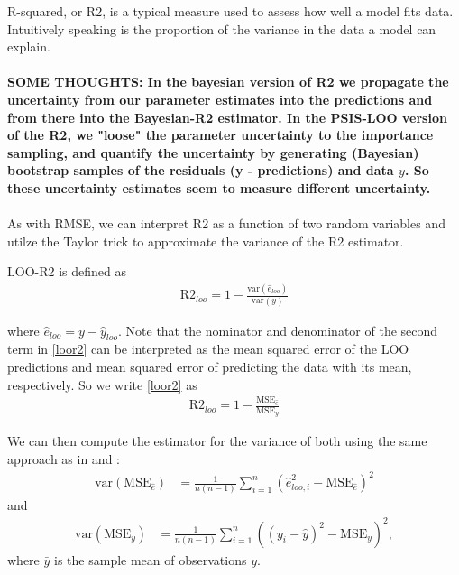 \documentclass{article}
\begin{document}

R-squared, or R2, is a typical measure used to assess how well a model fits data. Intuitively speaking is the proportion of the variance in the data a model can explain. 
\\ \\
\textbf{SOME THOUGHTS: In the bayesian version of R2 we propagate the uncertainty from our parameter estimates into the predictions and from there into the Bayesian-R2 estimator. In the PSIS-LOO version of the R2, we "loose" the parameter uncertainty to the importance sampling, and quantify the uncertainty by generating (Bayesian) bootstrap samples of the residuals (y - predictions) and data $y$. So these uncertainty estimates seem to measure different uncertainty.
}\\ \\

As with RMSE, we can interpret R2 as a function of two random variables and utilze the Taylor trick to approximate the variance of the R2 estimator.

LOO-R2 is defined as
\begin{align}
\text{R2}_{loo} = 1 - \frac{\text{var}(\hat{e}_{loo}) }{ \text{var}(y)} \label{loor2}
\end{align}

where $\hat{e}_{loo} = y - \hat{y}_{loo}$. Note that the nominator and denominator of the second term in \eqref{loor2} can be interpreted as the mean squared error of the LOO predictions and mean squared error of predicting the data with its mean, respectively. So we write \eqref{loor2} as 
\begin{align}
    \text{R2}_{loo} = 1 - \frac{\text{MSE}_{\hat{e}} }{ \text{MSE}_y} \label{mser2}
\end{align}

We can then compute the estimator for the variance of both using the same approach as in \cite{sivula_uncertainty_2022} and \cite{vehtari_practical_2016}:
\begin{align}
    \text{var}(\text{MSE}_{\hat{e}}) &= \frac{1}{n (n-1)} \sum_{i = 1}^n \left( \hat{e}_{loo, i}^2 - \text{MSE}_{\hat{e}} \right)^2 \label{vare}
\end{align}
and
\begin{align}
    \text{var}(\text{MSE}_y) &= \frac{1}{n (n-1)} \sum_{i = 1}^n \left( (y_i - \hat{y})^2 -\text{MSE}_y \right)^2 \label{vary},
\end{align}
where $\bar{y}$ is the sample mean of observations $y$. 
\end{document}
